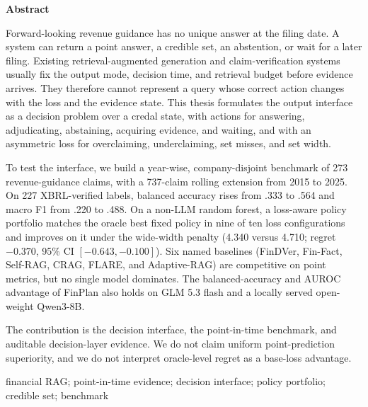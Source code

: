 \documentclass[12pt,openany]{ctexbook}
\begin{document}
\clearpage
{}
{}
\begin{center}{\arial\bfseries{} Abstract\par}\end{center}
\vspace{0.6cm}
{\arial\fontsize{10.5pt}{15pt}\selectfont\sloppy
Forward-looking revenue guidance has no unique answer at the filing date. A system can return a point answer, a credible set, an abstention, or wait for a later filing. Existing retrieval-augmented generation and claim-verification systems usually fix the output mode, decision time, and retrieval budget before evidence arrives. They therefore cannot represent a query whose correct action changes with the loss and the evidence state. This thesis formulates the output interface as a decision problem over a credal state, with actions for answering, adjudicating, abstaining, acquiring evidence, and waiting, and with an asymmetric loss for overclaiming, underclaiming, set misses, and set width.\par
To test the interface, we build a year-wise, company-disjoint benchmark of 273 revenue-guidance claims, with a 737-claim rolling extension from 2015 to 2025. On 227 XBRL-verified labels, balanced accuracy rises from .333 to .564 and macro F1 from .220 to .488. On a non-LLM random forest, a loss-aware policy portfolio matches the oracle best fixed policy in nine of ten loss configurations and improves on it under the wide-width penalty (4.340 versus 4.710; regret $-0.370$, 95\% CI $[-0.643,-0.100]$). Six named baselines (FinDVer, Fin-Fact, Self-RAG, CRAG, FLARE, and Adaptive-RAG) are competitive on point metrics, but no single model dominates. The balanced-accuracy and AUROC advantage of FinPlan also holds on GLM 5.3 flash and a locally served open-weight Qwen3-8B.\par
The contribution is the decision interface, the point-in-time benchmark, and auditable decision-layer evidence. We do not claim uniform point-prediction superiority, and we do not interpret oracle-level regret as a base-loss advantage.\par
}
\vspace{0.4cm}
 {\arial\fontsize{10.5pt}{15pt}\selectfont financial RAG; point-in-time evidence; decision interface; policy portfolio; credible set; benchmark}

\tableofcontents
\clearpage
\end{document}

